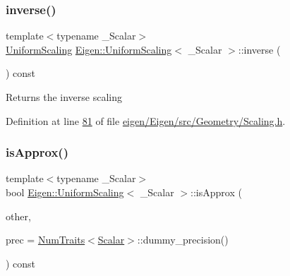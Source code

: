 \subsubsection{\texorpdfstring{inverse()}{inverse()}\hspace{0.1cm}{\footnotesize\ttfamily [2/2]}}
{\footnotesize\ttfamily template$<$typename \+\_\+\+Scalar$>$ \\
\hyperlink{class_eigen_1_1_uniform_scaling}{Uniform\+Scaling} \hyperlink{class_eigen_1_1_uniform_scaling}{Eigen\+::\+Uniform\+Scaling}$<$ \+\_\+\+Scalar $>$\+::inverse (\begin{DoxyParamCaption}{ }\end{DoxyParamCaption}) const\hspace{0.3cm}{\ttfamily [inline]}}

\begin{DoxyReturn}{Returns}
the inverse scaling 
\end{DoxyReturn}


Definition at line \hyperlink{eigen_2_eigen_2src_2_geometry_2_scaling_8h_source_l00081}{81} of file \hyperlink{eigen_2_eigen_2src_2_geometry_2_scaling_8h_source}{eigen/\+Eigen/src/\+Geometry/\+Scaling.\+h}.

\mbox{\label{class_eigen_1_1_uniform_scaling_a7f736fdbe43f7bce3d277312efdc315e}} 
\subsubsection{\texorpdfstring{is\+Approx()}{isApprox()}\hspace{0.1cm}{\footnotesize\ttfamily [1/2]}}
{\footnotesize\ttfamily template$<$typename \+\_\+\+Scalar$>$ \\
bool \hyperlink{class_eigen_1_1_uniform_scaling}{Eigen\+::\+Uniform\+Scaling}$<$ \+\_\+\+Scalar $>$\+::is\+Approx (\begin{DoxyParamCaption}\item[{const \hyperlink{class_eigen_1_1_uniform_scaling}{Uniform\+Scaling}$<$ \+\_\+\+Scalar $>$ \&}]{other,  }\item[{const typename \hyperlink{group___core___module_struct_eigen_1_1_num_traits}{Num\+Traits}$<$ \hyperlink{class_eigen_1_1_uniform_scaling_a04c4339f58f1210c5d4d34b1bd7ae283}{Scalar} $>$\+::Real \&}]{prec = {\ttfamily \hyperlink{group___core___module_struct_eigen_1_1_num_traits}{Num\+Traits}$<$\hyperlink{class_eigen_1_1_uniform_scaling_a04c4339f58f1210c5d4d34b1bd7ae283}{Scalar}$>$\+:\+:dummy\+\_\+precision()} }\end{DoxyParamCaption}) const\hspace{0.3cm}{\ttfamily [inline]}}

